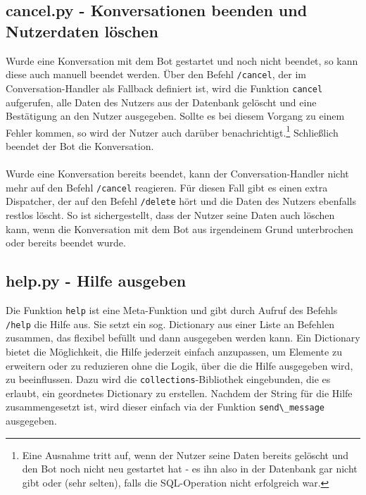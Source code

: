         \subsection{cancel.py - Konversationen beenden und Nutzerdaten löschen} \label{Implementierung: cancel.py}
            Wurde eine Konversation mit dem Bot gestartet und noch nicht beendet, so kann diese auch manuell beendet werden. Über den Befehl \verb|/cancel|, der im Conversation-Handler als Fallback definiert ist, wird die Funktion \verb|cancel| aufgerufen, alle Daten des Nutzers aus der Datenbank gelöscht und eine Bestätigung an den Nutzer ausgegeben. Sollte es bei diesem Vorgang zu einem Fehler kommen, so wird der Nutzer auch darüber benachrichtigt.\footnote{Eine Ausnahme tritt auf, wenn der Nutzer seine Daten bereits gelöscht und den Bot noch nicht neu gestartet hat - es ihn also in der Datenbank gar nicht gibt oder (sehr selten), falls die SQL-Operation nicht erfolgreich war.} Schließlich beendet der Bot die Konversation.\\ \\

            Wurde eine Konversation bereits beendet, kann der Conversation-Handler nicht mehr auf den Befehl \verb|/cancel| reagieren. Für diesen Fall gibt es einen extra Dispatcher, der auf den Befehl \verb|/delete| hört und die Daten des Nutzers ebenfalls restlos löscht. So ist sichergestellt, dass der Nutzer seine Daten auch löschen kann, wenn die Konversation mit dem Bot aus irgendeinem Grund unterbrochen oder bereits beendet wurde.

        \subsection{help.py - Hilfe ausgeben} \label{Implementierung: help.py}
            Die Funktion \verb|help| ist eine Meta-Funktion und gibt durch Aufruf des Befehls \verb|/help| die Hilfe aus. Sie setzt ein sog. Dictionary aus einer Liste an Befehlen zusammen, das flexibel befüllt und dann ausgegeben werden kann. Ein Dictionary bietet die Möglichkeit, die Hilfe jederzeit einfach anzupassen, um Elemente zu erweitern oder zu reduzieren ohne die Logik, über die die Hilfe ausgegeben wird, zu beeinflussen. Dazu wird die \verb|collections|-Bibliothek eingebunden, die es erlaubt, ein geordnetes Dictionary zu erstellen. Nachdem der String für die Hilfe zusammengesetzt ist, wird dieser einfach via der Funktion \verb|send\_message| ausgegeben.








